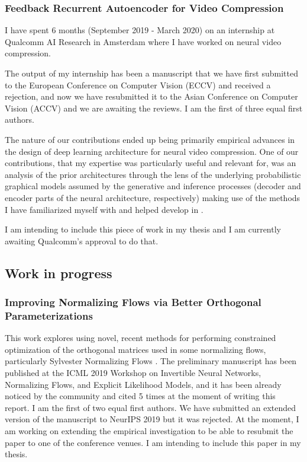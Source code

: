 \documentclass[12pt]{article}
\begin{document}
\subsubsection{Feedback Recurrent Autoencoder for Video Compression}%
I have spent 6 months (September 2019 - March 2020) on an internship at Qualcomm AI Research in Amsterdam where I have worked on neural video compression.

The output of my internship has been a manuscript that we have first submitted to the European Conference on Computer Vision (ECCV) and received a rejection, and now we have resubmitted it to the Asian Conference on Computer Vision (ACCV) and we are awaiting the reviews.
I am the first of three equal first authors.

The nature of our contributions ended up being primarily empirical advances in the design of deep learning architecture for neural video compression.
One of our contributions, that my expertise was particularly useful and relevant for, was an analysis of the prior architectures through the lens of the underlying probabilistic graphical models assumed by the generative and inference processes (decoder and encoder parts of the neural architecture, respectively) making use of the methods I have familiarized myself with and helped develop in \citep{Webb2018faithful}.

I am intending to include this piece of work in my thesis and I am currently awaiting Qualcomm's approval to do that.


\subsection{Work in progress}

\subsubsection{Improving Normalizing Flows via Better Orthogonal Parameterizations}%
This work explores using novel, recent methods for performing constrained optimization of the orthogonal matrices \citep{Lezcano2019exprnn} 
used in some normalizing flows, particularly Sylvester Normalizing Flows \citep{vandenBerg2018sylvester}.
The preliminary manuscript has been published at the ICML 2019 Workshop on Invertible Neural Networks, Normalizing Flows, and Explicit Likelihood Models, and it has been already noticed by the community and cited 5 times at the moment of writing this report.
I am the first of two equal first authors.
We have submitted an extended version of the manuscript to NeurIPS 2019 but it was rejected.
At the moment, I am working on extending the empirical investigation to be able to resubmit the paper to one of the conference venues.
I am intending to include this paper in my thesis. 
\end{document}
